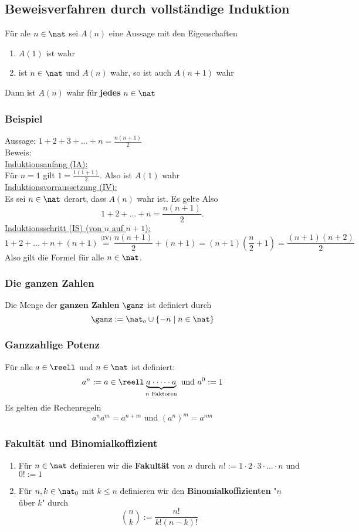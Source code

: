 \documentclass{kit}
\begin{document}
  \subsection{Beweisverfahren durch vollständige Induktion}
    Für ale $n\in\nat$ sei $A(n)$ eine Aussage mit den Eigenschaften
    \begin{enumerate}
      \item $A(1)$ ist wahr
      \item ist $n\in\nat$ und $A(n)$ wahr, so ist auch $A(n+1)$ wahr
    \end{enumerate}
    Dann ist $A(n)$ wahr für \textbf{jedes} $n\in\nat$
    \subsubsection{Beispiel}
      Aussage: $1+2+3+\dots+n=\frac{n(n+1)}{2}$\\
      Beweis:\\
      \underline{Induktionsanfang (IA):}\\
      Für $n=1$ gilt $1=\frac{1(1+1)}{2}$. Also ist $A(1)$ wahr\\
      \underline{Induktionsvorraussetzung (IV):}\\
      Es sei $n\in\nat$ derart, dass $A(n)$ wahr ist. Es gelte Also
      $$1+2+\dots+n=\frac{n(n+1)}{2}.$$
      \underline{Induktionsschritt (IS) (von $n$ auf $n+1$):}\\
      $$1+2+\dots+n+(n+1)\stackrel{\text{(IV)}}{=}\frac{n(n+1)}{2}+(n+1)=(n+1)(\frac{n}{2}+1)=\frac{(n+1)(n+2)}{2}$$
      Also gilt die Formel für alle $n\in\nat$.
    \subsubsection{Die ganzen Zahlen}
      Die Menge der \textbf{ganzen Zahlen} $\ganz$ ist definiert durch
      $$\ganz:=\nat_o\cup\{-n\mid n\in\nat\}$$
    \subsubsection{Ganzzahlige Potenz}
      Für alle $a\in\reell$ und $n\in\nat$ ist definiert:
      $$a^n:=a\in\reell\underbrace{a\cdot\dots\cdot a}_{n \text{ Faktoren}}\text{ und } a^0:=1$$
      Es gelten die Rechenregeln
      $$a^na^m=a^{n+m}\text{ und }(a^n)^m=a^{nm}$$
    \subsubsection{Fakultät und Binomialkoffizient}
      \begin{enumerate}
        \item Für $n\in\nat$ definieren wir die \textbf{Fakultät} von $n$ durch $n!:=1\cdot2\cdot3\cdot\dots\cdot n$ und $0!:=1$
        \item Für $n,k\in\nat_0$ mit $k\le n$ definieren wir den \textbf{Binomialkoffizienten} "$n$ über $k$" durch
          $$\binom{n}{k}:=\frac{n!}{k!(n-k)!}$$
      \end{enumerate}
\end{document}
